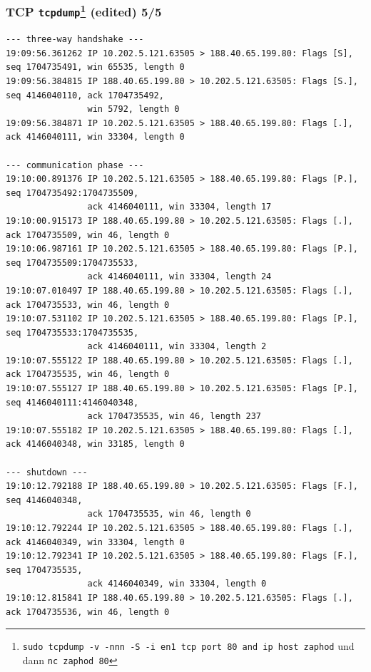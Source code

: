 \documentclass[ignorenonframetext]{beamer}
\begin{document}
\begin{frame}[fragile]
\frametitle{TCP \texttt{tcpdump}{}\footnote{\texttt{sudo tcpdump -v -nnn -S -i en1 tcp port 80 and ip host zaphod} und dann \texttt{nc zaphod 80}} (edited) 5/5}
\begin{tiny}
\begin{verbatim}
--- three-way handshake ---
19:09:56.361262 IP 10.202.5.121.63505 > 188.40.65.199.80: Flags [S], seq 1704735491, win 65535, length 0
19:09:56.384815 IP 188.40.65.199.80 > 10.202.5.121.63505: Flags [S.], seq 4146040110, ack 1704735492,
                win 5792, length 0
19:09:56.384871 IP 10.202.5.121.63505 > 188.40.65.199.80: Flags [.], ack 4146040111, win 33304, length 0

--- communication phase ---
19:10:00.891376 IP 10.202.5.121.63505 > 188.40.65.199.80: Flags [P.], seq 1704735492:1704735509,
                ack 4146040111, win 33304, length 17
19:10:00.915173 IP 188.40.65.199.80 > 10.202.5.121.63505: Flags [.], ack 1704735509, win 46, length 0
19:10:06.987161 IP 10.202.5.121.63505 > 188.40.65.199.80: Flags [P.], seq 1704735509:1704735533,
                ack 4146040111, win 33304, length 24
19:10:07.010497 IP 188.40.65.199.80 > 10.202.5.121.63505: Flags [.], ack 1704735533, win 46, length 0
19:10:07.531102 IP 10.202.5.121.63505 > 188.40.65.199.80: Flags [P.], seq 1704735533:1704735535,
                ack 4146040111, win 33304, length 2
19:10:07.555122 IP 188.40.65.199.80 > 10.202.5.121.63505: Flags [.], ack 1704735535, win 46, length 0
19:10:07.555127 IP 188.40.65.199.80 > 10.202.5.121.63505: Flags [P.], seq 4146040111:4146040348,
                ack 1704735535, win 46, length 237
19:10:07.555182 IP 10.202.5.121.63505 > 188.40.65.199.80: Flags [.], ack 4146040348, win 33185, length 0

--- shutdown ---
19:10:12.792188 IP 188.40.65.199.80 > 10.202.5.121.63505: Flags [F.], seq 4146040348,
                ack 1704735535, win 46, length 0
19:10:12.792244 IP 10.202.5.121.63505 > 188.40.65.199.80: Flags [.], ack 4146040349, win 33304, length 0
19:10:12.792341 IP 10.202.5.121.63505 > 188.40.65.199.80: Flags [F.], seq 1704735535,
                ack 4146040349, win 33304, length 0
19:10:12.815841 IP 188.40.65.199.80 > 10.202.5.121.63505: Flags [.], ack 1704735536, win 46, length 0
\end{verbatim}
\end{tiny}
\end{frame}
\end{document}
